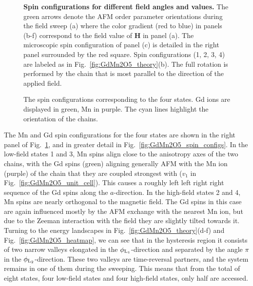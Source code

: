 \begin{figure}[h]
	\caption{{\bf Spin configurations for different field angles and values.} The green arrows denote the AFM order parameter orientations during the field sweep (a) where the color gradient (red to blue) in panels (b-f) correspond to the field value of $\bm{H}$ in panel (a). The microscopic spin configuration of panel (c) is detailed in the right panel surrounded by the red square. Spin configurations (1, 2, 3, 4) are labeled as in Fig.~\ref{fig:GdMn2O5_theory}(b). The full rotation is performed by the chain that is most parallel to the direction of the applied field.\label{fig:GdMn2O5_regimes}}  
\end{figure}
\begin{figure}[h!]
    \centering
    \caption{\label{fig:GdMn2O5_spin_configs} The spin configurations corresponding to the four states. Gd ions are displayed in green, Mn in purple. The cyan lines highlight the orientation of the chains. }
    \label{fig:my_label}
\end{figure}

The Mn and Gd spin configurations for the four states are shown in the right panel of Fig.~\ref{fig:GdMn2O5_regimes}, and in greater detail in Fig.~\ref{fig:GdMn2O5_spin_configs}. 
%
In the low-field states 1 and 3, Mn spins align close to the anisotropy axes of the two chains, with the Gd spins (green) aligning generally AFM with the Mn ion (purple) of the chain that they are coupled strongest with ($v_1$ in Fig.~\ref{fig:GdMn2O5_unit_cell}). This causes a roughly left left right right sequence of the Gd spins along the $a$-direction. 
% 
In the high-field states 2 and 4, Mn spins are nearly orthogonal to the magnetic field. The Gd spins in this case are again influenced mostly by the AFM exchange with the nearest Mn ion, but due to the Zeeman interaction with the field they are slightly tilted towards it. 
%
Turning to the energy landscapes in Fig.~\ref{fig:GdMn2O5_theory}(d-f) and Fig.~\ref{fig:GdMn2O5_heatmap}, we can see that in the hysteresis region it consists of two narrow valleys elongated in the $\phi_{\rm L_1}$-direction and separated by the angle $\pi$ in the $\phi_{\rm L_2}$-direction.
These two valleys are time-reversal partners, and the system remains in one of them during the sweeping.
This means that from the total of eight states, four low-field states and four high-field states, only half are accessed.

